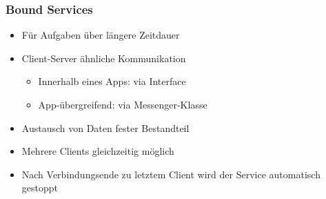 \subsubsection{Bound Services}
\begin{itemize}[topsep=0pt, leftmargin=4mm]
    \setlength\itemsep{-0.3em}
    \item Für Aufgaben über längere Zeitdauer
    \item Client-Server ähnliche Kommunikation
    \begin{itemize}[topsep=0pt, leftmargin=4mm]
        \setlength\itemsep{-0.3em}
        \item Innerhalb eines Apps: via Interface
        \item App-übergreifend: via Messenger-Klasse
    \end{itemize}
    \item Austausch von Daten fester Bestandteil
    \item Mehrere Clients gleichzeitig möglich
    \item Nach Verbindungsende zu letztem Client wird der Service automatisch gestoppt
\end{itemize}

